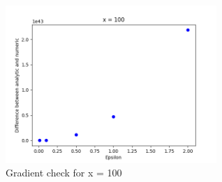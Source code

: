 \documentclass[submit]{harvardml}
\begin{document}
\begin{enumerate}
\begin{center}
        \includegraphics[width=0.6\textwidth]{x100}\\
        Gradient check for x = 100
    \end{center}
\end{enumerate}
\end{document}
